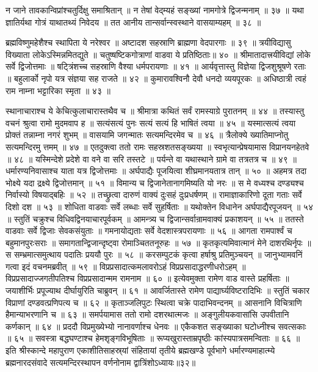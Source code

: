 न जाने तावकान्विप्रांश्चतुर्दिक्षु समाश्रितान् ॥
न तेषां वेद्म्यहं सङ्ख्यां नामगोत्रे द्विजन्मनाम् ॥ ३७ ॥
यथा ज्ञातिर्यथा गोत्रं याथातथ्यं निवेदय ॥
तत आनीय तान्सर्वान्स्वस्थाने वासयाम्यहम् ॥ ३८ ॥

ब्रह्मविष्णुमहेशैश्च स्थापिता ये नरेश्वर ॥
अष्टादश सहस्राणि ब्राह्मणा वेदपारगाः ॥ ३९ ॥
त्रयीविद्यासु विख्याता लोकेऽस्मिन्नमितद्युते ॥
चतुष्षष्टिकगोत्राणां वाडवा ये प्रतिष्ठिताः॥ ४० ॥
श्रीमातादात्त्रयीविद्यां लोके सर्वे द्विजोत्तमाः ॥
षट्त्रिंशच्च सहस्राणि वैश्या धर्मपरायणाः ॥ ४१ ॥
आर्यवृत्तास्तु विज्ञेया द्विजशुश्रूषणे रताः ॥
बहुलार्को नृपो यत्र संज्ञया सह राजते ॥ ४२ ॥
कुमारावश्विनौ देवौ धनदो व्ययपूरकः ॥
अधिष्ठात्री त्वहं राम नाम्ना भट्टारिका स्मृता ॥ ४३ ॥

स्थानाचाराश्च ये केचित्कुलाचारास्तथैव च ॥
श्रीमात्रा कथितं सर्वं रामस्याग्रे पुरातनम् ॥ ४४ ॥
तस्यास्तु वचनं श्रुत्वा रामो मुदमवाप ह ॥
सत्यंसत्यं पुनः सत्यं सत्यं हि भाषितं त्वया ॥ ४५ ॥
यस्मात्सत्यं त्वया प्रोक्तं तन्नाम्ना नगरं शुभम् ॥
वासयामि जगन्मातः सत्यमन्दिरमेव च ॥ ४६ ॥
त्रैलोक्ये ख्यातिमाप्नोतु सत्यमन्दिरमु त्तमम् ॥ ४७ ॥
एतदुक्त्वा ततो रामः सहस्रशतसङ्ख्यया ॥
स्वभृत्यान्प्रेषयामास विप्रानयनहेतवे ॥ ४८ ॥
यस्मिन्देशे प्रदेशे वा वने वा सरि तस्तटे ॥
पर्यन्ते वा यथास्थाने ग्रामे वा तत्रतत्र च ॥ ४९ ॥
धर्मारण्यनिवासाश्च याता यत्र द्विजोत्तमाः ॥
अर्घपाद्यैः पूजयित्वा शीघ्रमानयतात्र तान् ॥ ५० ॥
अहमत्र तदा भोक्ष्ये यदा द्रक्ष्ये द्विजोत्तमान् ॥ ५१ ॥
विमान्य च द्विजानेतानागमिष्यति यो नरः ॥
स मे वध्यश्च दण्ड्यश्च निर्वास्यो विषयाद्बहिः ॥ ५२ ॥
तच्छ्रुत्वा दारुणं वाक्यं दुःसहं दुःप्रधर्षणम् ॥
रामाज्ञाकारिणो दूता गताः सर्वे दिशो दश ॥ ५३ ॥
शोधिता वाडवाः सर्वे लब्धाः सर्वे सुहर्षिताः ॥
यथोक्तेन विधानेन अर्घपाद्यैरपूजयन् ॥ ५४ ॥
स्तुतिं चक्रुश्च विधिवद्विनयाचारपूर्वकम् ॥
आमन्त्र्य च द्विजान्सर्वान्रामवाक्यं प्रकाशयन् ॥ ५५ ॥
ततस्ते वाडवाः सर्वे द्विजाः सेवकसंयुताः ॥
गमनायोद्यताः सर्वे वेदशास्त्रपरायणाः ॥ ५६ ॥
आगता रामपार्श्वं च बहुमानपुरःसराः ॥
समागतान्द्विजान्दृष्ट्वा रोमाञ्चिततनूरुहः ॥ ५७ ॥
कृतकृत्यमिवात्मानं मेने दाशरथिर्नृपः ॥
स सम्भ्रमात्समुत्थाय पदातिः प्रययौ पुरः ॥ ५८ ॥
करसम्पुटकं कृत्वा हर्षाश्रु प्रतिमुञ्चयन् ॥
जानुभ्यामवनिं गत्वा इदं वचनमब्रवीत् ॥ ५९ ॥
विप्रप्रसादात्कमलावरोऽहं विप्रप्रसादाद्धरणीधरोऽहम् ॥
विप्रप्रसादाज्जगतीपतिश्च विप्रप्रसादान्मम रामनाम ॥ ६० ॥
इत्येवमुक्ता रामेण वाड वास्ते प्रहर्षिताः ॥
जयाशीर्भिः प्रपूज्याथ दीर्घायुरिति चाब्रुवन् ॥ ६१ ॥
आवर्जितास्ते रामेण पाद्यार्घ्यविष्टरादिभिः ॥
स्तुतिं चकार विप्राणां दण्डवत्प्रणिपत्य च ॥ ६२ ॥
कृताञ्जलिपुटः स्थित्वा चक्रे पादाभिवन्दनम् ॥
आसनानि विचित्राणि हैमान्याभरणानि च ॥ ६३ ॥
समर्पयामास ततो रामो दशरथात्मजः ॥
अङ्गुलीयकवासांसि उपवीतानि कर्णकान् ॥ ६४ ॥
प्रददौ विप्रमुख्येभ्यो नानावर्णाश्च धेनवः ॥
एकैकशत सङ्ख्याका घटोध्नीश्च सवत्सकाः ॥ ६५ ॥
सवस्त्रा बद्धघण्टाश्च हेमशृङ्गविभूषिताः ॥
रूप्यखुरास्ताम्रपृष्ठीः कांस्यपात्रसमन्विताः ॥ ६६ ॥
इति श्रीस्कान्दे महापुराण एकाशीतिसाहस्र्यां संहितायां तृतीये ब्रह्मखण्डे पूर्वभागे धर्मारण्यमाहात्म्ये ब्रह्मनारदसंवादे सत्यमन्दिरस्थापन वर्णनोनाम द्वात्रिंशोऽध्यायः॥३२॥

